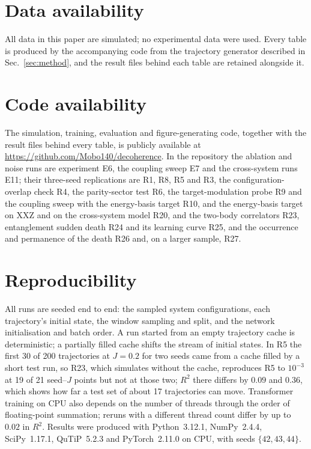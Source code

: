 \documentclass[twocolumn,10pt]{article}
\begin{document}
\section*{Data availability}
All data in this paper are simulated; no experimental data were used.
Every table is produced by the accompanying code from the trajectory
generator described in Sec.~\ref{sec:method}, and the result files behind
each table are retained alongside it.

\section*{Code availability}
The simulation, training, evaluation and figure-generating code, together
with the result files behind every table, is publicly available at
\url{https://github.com/Mobo140/decoherence}.
In the repository the ablation and noise runs are experiment E6, the
coupling sweep E7 and the cross-system runs E11; their three-seed
replications are R1, R8, R5 and R3, the configuration-overlap check R4,
the parity-sector test R6, the target-modulation probe R9 and the
coupling sweep with the energy-basis target R10, and the energy-basis
target on XXZ and on the cross-system model R20, and the two-body
correlators R23, entanglement sudden death R24 and its learning
curve R25, and the occurrence and permanence of the death R26 and,
on a larger sample, R27.

\section*{Reproducibility}
All runs are seeded end to end: the sampled system configurations, each
trajectory's initial state, the window sampling and split, and the
network initialisation and batch order.
A run started from an empty trajectory cache is deterministic; a
partially filled cache shifts the stream of initial states. In R5 the
first 30 of 200 trajectories at $J = 0.2$ for two seeds came from a cache
filled by a short test run, so R23, which simulates without the cache,
reproduces R5 to $10^{-3}$ at 19 of 21 seed--$J$ points but not at those
two; $R^2$ there differs by $0.09$ and $0.36$, which shows how far a test
set of about 17 trajectories can move. Transformer training on CPU also depends
on the number of threads through the order of floating-point summation;
reruns with a different thread count differ by up to $0.02$ in $R^2$.
Results were produced with Python~3.12.1, NumPy~2.4.4, SciPy~1.17.1,
QuTiP~5.2.3 and PyTorch~2.11.0 on CPU, with seeds $\{42,43,44\}$.
\end{document}
